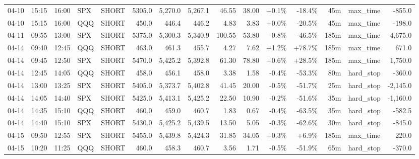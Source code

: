 \documentclass[11pt,a4paper,twoside]{article}
\begin{document}
\begin{landscape}
\begin{center}
\begin{longtable}{>{\color{txtmain}}l l l l l r r r r r r r r >{\color{txtmain}}l r}
04-10 & 15:15 & 16:00 & SPX & SHORT & 5305.0 & 5,270.0 & 5,267.1 & 46.55 & 38.00 & \textcolor{wingreen}{+0.1\%} & \textcolor{lossred}{-18.4\%} & 45m & max\_time & \textcolor{lossred}{-855.0} \\
04-10 & 15:15 & 16:00 & QQQ & SHORT & 450.0 & 446.4 & 446.2 & 4.83 & 3.83 & \textcolor{wingreen}{+0.0\%} & \textcolor{lossred}{-20.5\%} & 45m & max\_time & \textcolor{lossred}{-198.0} \\
04-11 & 09:55 & 13:00 & SPX & SHORT & 5375.0 & 5,300.3 & 5,340.9 & 100.55 & 53.80 & \textcolor{lossred}{-0.8\%} & \textcolor{lossred}{-46.5\%} & 185m & max\_time & \textcolor{lossred}{-4,675.0} \\
04-14 & 09:40 & 12:45 & QQQ & SHORT & 463.0 & 461.3 & 455.7 & 4.27 & 7.62 & \textcolor{wingreen}{+1.2\%} & \textcolor{wingreen}{+78.7\%} & 185m & max\_time & \textcolor{wingreen}{671.0} \\
04-14 & 09:45 & 12:50 & SPX & SHORT & 5470.0 & 5,425.2 & 5,392.8 & 61.30 & 78.80 & \textcolor{wingreen}{+0.6\%} & \textcolor{wingreen}{+28.5\%} & 185m & max\_time & \textcolor{wingreen}{1,750.0} \\
04-14 & 12:45 & 14:05 & QQQ & SHORT & 458.0 & 456.1 & 458.0 & 3.38 & 1.58 & \textcolor{lossred}{-0.4\%} & \textcolor{lossred}{-53.3\%} & 80m & hard\_stop & \textcolor{lossred}{-360.0} \\
04-14 & 13:00 & 13:25 & SPX & SHORT & 5405.0 & 5,373.7 & 5,402.8 & 41.45 & 20.00 & \textcolor{lossred}{-0.5\%} & \textcolor{lossred}{-51.7\%} & 25m & hard\_stop & \textcolor{lossred}{-2,145.0} \\
04-14 & 14:05 & 14:40 & SPX & SHORT & 5425.0 & 5,413.1 & 5,425.2 & 22.50 & 10.90 & \textcolor{lossred}{-0.2\%} & \textcolor{lossred}{-51.6\%} & 35m & hard\_stop & \textcolor{lossred}{-1,160.0} \\
04-14 & 14:35 & 15:10 & QQQ & SHORT & 460.0 & 459.0 & 460.7 & 1.83 & 0.67 & \textcolor{lossred}{-0.4\%} & \textcolor{lossred}{-63.5\%} & 35m & hard\_stop & \textcolor{lossred}{-582.5} \\
04-14 & 14:40 & 15:10 & SPX & SHORT & 5430.0 & 5,425.2 & 5,439.5 & 13.50 & 5.05 & \textcolor{lossred}{-0.3\%} & \textcolor{lossred}{-62.6\%} & 30m & hard\_stop & \textcolor{lossred}{-845.0} \\
04-15 & 09:50 & 12:55 & SPX & SHORT & 5455.0 & 5,439.8 & 5,424.3 & 31.85 & 34.05 & \textcolor{wingreen}{+0.3\%} & \textcolor{wingreen}{+6.9\%} & 185m & max\_time & \textcolor{wingreen}{220.0} \\
04-15 & 10:20 & 11:25 & QQQ & SHORT & 460.0 & 458.3 & 460.7 & 3.56 & 1.71 & \textcolor{lossred}{-0.5\%} & \textcolor{lossred}{-51.9\%} & 65m & hard\_stop & \textcolor{lossred}{-370.0} \\

\end{longtable}
\end{center}
\end{landscape}
\end{document}
